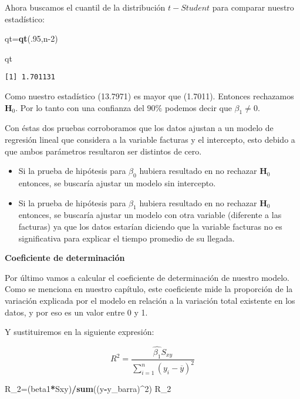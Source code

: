 \documentclass[
  a4paper,
  oneside,
  openany]{book}
\newenvironment{Shaded}{\begin{snugshade}}{\end{snugshade}}
\newcommand{\DecValTok}[1]{\textcolor[rgb]{0.00,0.00,0.81}{#1}}
\newcommand{\KeywordTok}[1]{\textcolor[rgb]{0.13,0.29,0.53}{\textbf{#1}}}
\newcommand{\NormalTok}[1]{#1}
\newcommand{\OperatorTok}[1]{\textcolor[rgb]{0.81,0.36,0.00}{\textbf{#1}}}
\begin{document}
Ahora buscamos el cuantil de la distribución \(t-Student\) para comparar nuestro estadístico:

\begin{Shaded}
\begin{Highlighting}[]
\NormalTok{qt=}\KeywordTok{qt}\NormalTok{(.}\DecValTok{95}\NormalTok{,n}\DecValTok{{-}2}\NormalTok{) }

\NormalTok{qt}
\end{Highlighting}
\end{Shaded}

\begin{verbatim}
[1] 1.701131
\end{verbatim}

Como nuestro estadístico (13.7971) es mayor que (1.7011). Entonces rechazamos \(\textbf{H}_0\). Por lo tanto con una confianza del \(90\%\) podemos decir que \(\beta_{1} \neq 0.\)

Con éstas dos pruebas corroboramos que los datos ajustan a un modelo de regresión lineal que considera a la variable facturas y el intercepto, esto debido a que ambos parámetros resultaron ser distintos de cero.

\begin{itemize}
\item
  Si la prueba de hipótesis para \(\beta_{0 }\) hubiera resultado en no rechazar \(\textbf{H}_0\) entonces, se buscaría ajustar un modelo sin intercepto.
\item
  Si la prueba de hipótesis para \(\beta_{1}\) hubiera resultado en no rechazar \(\textbf{H}_0\) entonces, se buscaría ajustar un modelo con otra variable (diferente a las facturas) ya que los datos estarían diciendo que la variable facturas no es significativa para explicar el tiempo promedio de su llegada.
\end{itemize}

\textbf{Coeficiente de determinación}

Por último vamos a calcular el coeficiente de determinación de nuestro modelo. Como se menciona en nuestro capítulo, este coeficiente mide la proporción de la variación explicada por el modelo en relación a la variación total existente en los datos, y por eso es un valor entre 0 y 1.

Y sustituiremos en la siguiente expresión:

\[R^2=\frac{\hat{\beta_{1}}S_{xy}}{\sum_{i=1}^{n}(y_{i}-\overline{y})^2}\]

\begin{Shaded}
\begin{Highlighting}[]
\NormalTok{R\_}\DecValTok{2}\NormalTok{=(beta1}\OperatorTok{*}\NormalTok{Sxy)}\OperatorTok{/}\KeywordTok{sum}\NormalTok{((y}\OperatorTok{{-}}\NormalTok{y\_barra)}\OperatorTok{\^{}}\DecValTok{2}\NormalTok{)}
\NormalTok{R\_}\DecValTok{2}
\end{Highlighting}
\end{Shaded}
\end{document}
